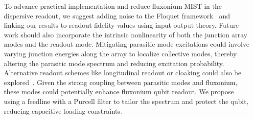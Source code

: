 \documentclass[%
reprint,
superscriptaddress,
 amsmath,amssymb,
 aps,
 prx,
longbibliography,
floatfix,
]{revtex4-2}
\newcommand{\sh}[1]{{\color{orange}{{}[SS: #1]}}}%
\begin{document}

To advance practical implementation and reduce fluxonium MIST in the dispersive readout, we suggest adding noise to the Floquet framework~\cite{huang_engineering_2021} and linking our results to readout fidelity values using input-output theory. Future work should also incorporate the intrinsic nonlinearity of both the junction array modes and the readout mode. Mitigating parasitic mode excitations could involve varying junction energies along the array to localize collective modes, thereby altering the parasitic mode spectrum and reducing excitation probability. Alternative readout schemes like longitudinal readout or cloaking could also be explored~\cite{reed_high-fidelity_2010, munoz-arias_qubit_2023, didier_fast_2015}. Given the strong coupling between parasitic modes and fluxonium, these modes could potentially enhance fluxonium qubit readout. We propose using a feedline with a Purcell filter to tailor the spectrum and protect the qubit, reducing capacitive loading constraints.
\end{document}
